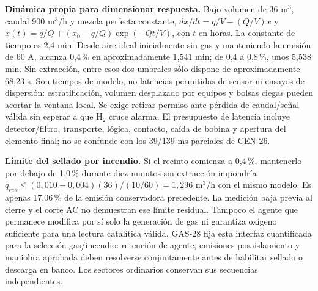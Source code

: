 \textbf{Dinámica propia para dimensionar respuesta.} Bajo volumen de 36 m$^3$, caudal 900 m$^3$/h y mezcla perfecta constante, $dx/dt=q/V-(Q/V)x$ y $x(t)=q/Q+(x_0-q/Q)\exp(-Qt/V)$, con $t$ en horas. La constante de tiempo es 2,4 min. Desde aire ideal inicialmente sin gas y manteniendo la emisión de 60 A, alcanza 0,4\,\% en aproximadamente 1,541 min; de 0,4 a 0,8\,\%, unos 5,538 min. Sin extracción, entre esos dos umbrales sólo dispone de aproximadamente 68,23 s. Son tiempos de modelo, no latencias permitidas de sensor ni ensayos de dispersión: estratificación, volumen desplazado por equipos y bolsas ciegas pueden acortar la ventana local. Se exige retirar permiso ante pérdida de caudal/señal válida sin esperar a que H$_2$ cruce alarma. El presupuesto de latencia incluye detector/filtro, transporte, lógica, contacto, caída de bobina y apertura del elemento final; no se confunde con los 39/139 ms parciales de CEN-26.

\textbf{Límite del sellado por incendio.} Si el recinto comienza a 0,4\,\%, mantenerlo por debajo de 1,0\,\% durante diez minutos sin extracción impondría $q_{res}\leq(0,010-0,004)(36)/(10/60)=1,296$ m$^3$/h con el mismo modelo. Es apenas 17,06\,\% de la emisión conservadora precedente. La medición baja previa al cierre y el corte AC no demuestran ese límite residual. Tampoco el agente que permanece modifica por sí solo la generación de gas ni garantiza oxígeno suficiente para una lectura catalítica válida. GAS-28 fija esta interfaz cuantificada para la selección gas/incendio: retención de agente, emisiones posaislamiento y maniobra aprobada deben resolverse conjuntamente antes de habilitar sellado o descarga en banco. Los sectores ordinarios conservan sus secuencias independientes.
